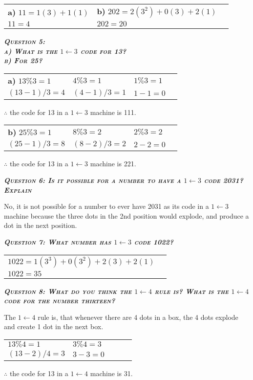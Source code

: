 \documentclass{article}
\begin{document}
\begin{tabular}{l l l}
    \textbf{a)} $11 = 1(3)+1(1)$ & \textbf{b)} $202 = 2(3^2)+0(3)+2(1)$
    & \\
    $11 = 4$ & $202=20$ 
\end{tabular}

\newpage

\textbf{\emph{\textsc{Question 5: \\
a) What is the $1 \leftarrow 3$ code for 13? \\
b) For 25?}}}

\begin{tabular}{l l l l}
    \textbf{a)} $13\%3=1$ & $4\%3=1$ & $1\%3=1$
    & \\
    $(13-1)/3=4$ & $(4-1)/3=1$ & $1-1=0$
\end{tabular}

$\therefore$ the code for 13 in a $1 \leftarrow 3$ machine is 111.

\begin{tabular}{l l l l}
    \textbf{b)} $25\%3=1$ & $8\%3=2$ & $2\%3=2$
    & \\
    $(25-1)/3=8$ & $(8-2)/3=2$ & $2-2=0$
\end{tabular}

$\therefore$ the code for 13 in a $1 \leftarrow 3$ machine is 221.

\textbf{\emph{\textsc{Question 6: Is it possible for a number to have a $1 \leftarrow 3$ code 2031? Explain}}}

No, it is not possible for a number to ever have 2031 as its code in a $1 \leftarrow 3$ machine because the three dots in the 2nd position would explode, and produce a dot in the next position. 

\textbf{\emph{\textsc{Question 7: What number has $1 \leftarrow 3$ code 1022?}}}

\begin{tabular}{l l}
    $1022=1(3^3)+0(3^2)+2(3)+2(1)$
    & \\
    $1022=35$
\end{tabular}

\textbf{\emph{\textsc{Question 8: What do you think the $1 \leftarrow 4$ rule is? What is the $1 \leftarrow 4$ code for the number thirteen?}}}

The $1 \leftarrow 4$ rule is, that whenever there are 4 dots in a box, the 4 dots explode and create 1 dot in the next box.

\begin{tabular}{l l l l l}
    $13\%4=1$ & $3\%4=3$
    & \\
    $(13-2)/4=3$ & $3-3=0$
\end{tabular}
$\therefore$ the code for 13 in a $1 \leftarrow 4$ machine is 31.
\end{document}
